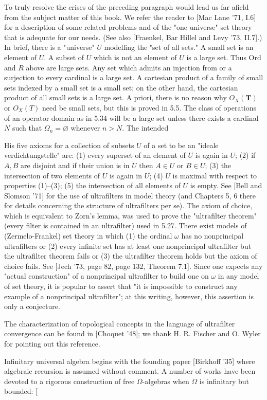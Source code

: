 To truly resolve the crises of the preceding paragraph would lead us far afield from the subject matter of this book. We refer the reader to [Mac Lane '71, I.6] for a description of some related problems and of the "one universe" set theory that is adequate for our needs. (See also [Fraenkel, Bar Hillel and Levy '73, II.7].) In brief, there is a "universe" $U$ modelling the "set of all sets." A small set is an element of $U$. A subset of $U$ which is not an element of $U$ is a large set. Thus Ord and $R$ above are large sets. Any set which admits an injection from or a surjection to every cardinal is a large set. A cartesian product of a family of small sets indexed by a small set is a small set; on the other hand, the cartesian product of all small sets is a large set. A priori, there is no reason why $O_X(\mathbf{T})$ or $O_X(T)$ need be small sets, but this is proved in 5.5. The class of operations of an operator domain as in 5.34 will be a large set unless there exists a cardinal $N$ such that $\Omega_n = \varnothing$ whenever $n > N$. The intended

His five axioms for a collection of subsets $U$ of a set to be an "ideale verdichtungstelle" are: (1) every superset of an element of $U$ is again in $U$; (2) if $A, B$ are disjoint and if their union is in $U$ then $A \in U$ or $B \in U$; (3) the intersection of two elements of $U$ is again in $U$; (4) $U$ is maximal with respect to properties (1)–(3); (5) the intersection of all elements of $U$ is empty. See [Bell and Slomson '71] for the use of ultrafilters in model theory (and Chapters 5, 6 there for details concerning the structure of ultrafilters per se). The axiom of choice, which is equivalent to Zorn's lemma, was used to prove the "ultrafilter theorem" (every filter is contained in an ultrafilter) used in 5.27. There exist models of (Zermelo-Frankel) set theory in which (1) the ordinal $\omega$ has no nonprincipal ultrafilters or (2) every infinite set has at least one nonprincipal ultrafilter but the ultrafilter theorem fails or (3) the ultrafilter theorem holds but the axiom of choice fails. See [Jech '73, page 82, page 132, Theorem 7.1]. Since one expects any "actual construction" of a nonprincipal ultrafilter to build one on $\omega$ in any model of set theory, it is popular to assert that "it is impossible to construct any example of a nonprincipal ultrafilter"; at this writing, however, this assertion is only a conjecture.

The characterization of topological concepts in the language of ultrafilter convergence can be found in [Choquet '48]; we thank H. R. Fischer and O. Wyler for pointing out this reference.

Infinitary universal algebra begins with the founding paper [Birkhoff '35] where algebraic recursion is assumed without comment. A number of works have been devoted to a rigorous construction of free $\Omega$-algebras when $\Omega$ is infinitary but bounded: [